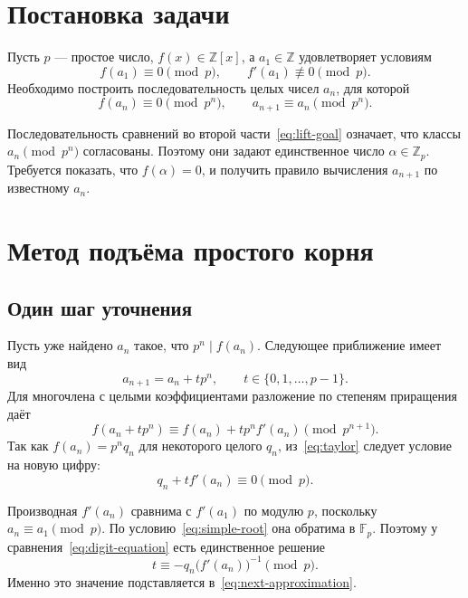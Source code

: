 \documentclass{misisarticle}
\begin{document}
\section{Постановка задачи}

Пусть $p$ --- простое число, $f(x)\in\mathbb Z[x]$, а $a_1\in\mathbb Z$ удовлетворяет условиям
\begin{equation}
  f(a_1)\equiv0\pmod p,
  \qquad
  f'(a_1)\not\equiv0\pmod p.
  \label{eq:simple-root}
\end{equation}
Необходимо построить последовательность целых чисел $a_n$, для которой
\begin{equation}
  f(a_n)\equiv0\pmod {p^n},
  \qquad
  a_{n+1}\equiv a_n\pmod {p^n}.
  \label{eq:lift-goal}
\end{equation}

Последовательность сравнений во второй части~\eqref{eq:lift-goal} означает, что классы $a_n\pmod {p^n}$ согласованы. Поэтому они задают единственное число $\alpha\in\mathbb Z_p$. Требуется показать, что $f(\alpha)=0$, и получить правило вычисления $a_{n+1}$ по известному $a_n$.

\section{Метод подъёма простого корня}

\subsection{Один шаг уточнения}

Пусть уже найдено $a_n$ такое, что $p^n\mid f(a_n)$. Следующее приближение имеет вид
\begin{equation}
  a_{n+1}=a_n+t p^n,
  \qquad t\in\{0,1,\ldots,p-1\}.
  \label{eq:next-approximation}
\end{equation}
Для многочлена с целыми коэффициентами разложение по степеням приращения даёт
\begin{equation}
  f(a_n+t p^n)\equiv f(a_n)+t p^n f'(a_n)
  \pmod {p^{n+1}}.
  \label{eq:taylor}
\end{equation}
Так как $f(a_n)=p^n q_n$ для некоторого целого $q_n$, из~\eqref{eq:taylor} следует условие на новую цифру:
\begin{equation}
  q_n+t f'(a_n)\equiv0\pmod p.
  \label{eq:digit-equation}
\end{equation}

Производная $f'(a_n)$ сравнима с $f'(a_1)$ по модулю $p$, поскольку $a_n\equiv a_1\pmod p$. По условию~\eqref{eq:simple-root} она обратима в $\mathbb F_p$. Поэтому у сравнения~\eqref{eq:digit-equation} есть единственное решение
\begin{equation}
  t\equiv-q_n\bigl(f'(a_n)\bigr)^{-1}\pmod p.
  \label{eq:digit-formula}
\end{equation}
Именно это значение подставляется в~\eqref{eq:next-approximation}.
\end{document}
